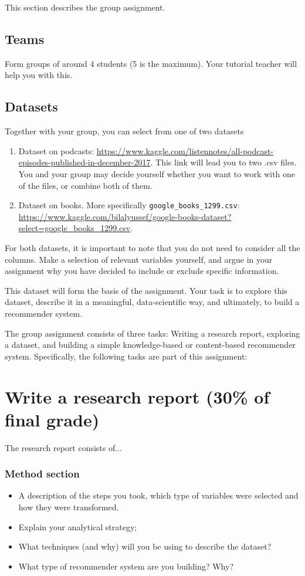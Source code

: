 
This section describes the group assignment. 

\subsection*{Teams}


Form groups of around 4 students (5 is the maximum). Your tutorial teacher will help you with this.

\subsection*{Datasets}
Together with your group, you can select from one of two datasets
\begin{enumerate}
	\item Dataset on podcasts: \url{https://www.kaggle.com/listennotes/all-podcast-episodes-published-in-december-2017}. This link will lead you to two .csv files. You and your group may decide yourself whether you want to work with one of the files, or combine both of them.
	\item Dataset on books. More specifically \texttt{google\_books\_1299.csv}: \url{https://www.kaggle.com/bilalyussef/google-books-dataset?select=google_books_1299.csv}. 
\end{enumerate}

For both datasets, it is important to note that you do not need to consider all the columns. Make a selection of relevant variables yourself, and argue in your assignment why you have decided to include or exclude specific information. 

This dataset will form the basis of the assignment. Your task is to explore this dataset, describe it in a meaningful, data-scientific way, and ultimately, to build a recommender system.

The group assignment consists of three tasks: Writing a research report, exploring a dataset, and building a simple knowledge-based or content-based recommender system. Specifically, the following tasks are part of this assignment:

\section{Write a research report (30\% of final grade)}

The research report consists of...

\subsubsection{Method section}
\begin{itemize}
\item A description of the steps you took, which type of variables were selected and how they were transformed.
\item Explain your analytical strategy;
\item What techniques (and why) will you be using to describe the dataset?
\item What type of recommender system are you building? Why?  
\end{itemize}
	
